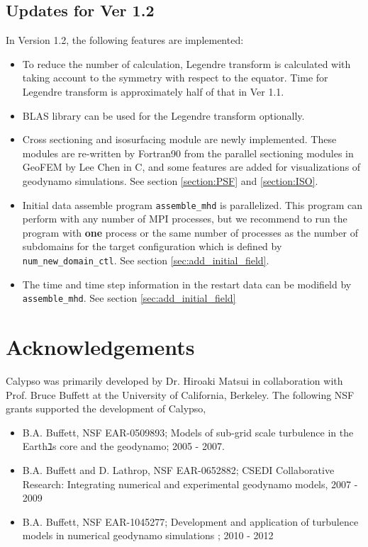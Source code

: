 \subsection{Updates for Ver 1.2}
In Version 1.2, the following features are implemented:
\begin{itemize}
\item To reduce the number of calculation, Legendre transform is calculated with taking account to the symmetry with respect to the equator. Time for Legendre transform is approximately half of that in Ver 1.1.
\item BLAS library can be used for the Legendre transform optionally.
\item Cross sectioning and isosurfacing module are newly implemented. These modules are re-written by Fortran90 from the parallel sectioning modules in GeoFEM by Lee Chen in C, and some features are added for visualizations of geodynamo simulations. See section \ref{section:PSF} and \ref{section:ISO}.
\item Initial data assemble program \verb|assemble_mhd| is parallelized. This program can perform with any number of MPI processes, but we recommend to run the program with {\bf one} process or the same number of processes as the number of subdomains for the target configuration which is defined by \verb|num_new_domain_ctl|. See section \ref{sec:add_initial_field}.
\item The time and time step information in the restart data can be modifield by  \verb|assemble_mhd|. See section \ref{sec:add_initial_field}
\end{itemize}


\section{Acknowledgements}
\label{section:acknowledgements}
Calypso was primarily developed by Dr. Hiroaki Matsui in collaboration with Prof. Bruce Buffett at the University of California, Berkeley. The following NSF grants supported the development of Calypso, 
%
\begin{itemize}
\item B.A. Buffett, NSF EAR-0509893; Models of sub-grid scale turbulence in the Earthﾕs core and the geodynamo; 2005 - 2007.
\item B.A. Buffett and D. Lathrop,  NSF EAR-0652882; CSEDI Collaborative Research: Integrating numerical and experimental geodynamo models, 2007 - 2009
\item B.A. Buffett, NSF EAR-1045277; Development and application of turbulence models in numerical geodynamo simulations ;  2010 - 2012
\end{itemize}
%

